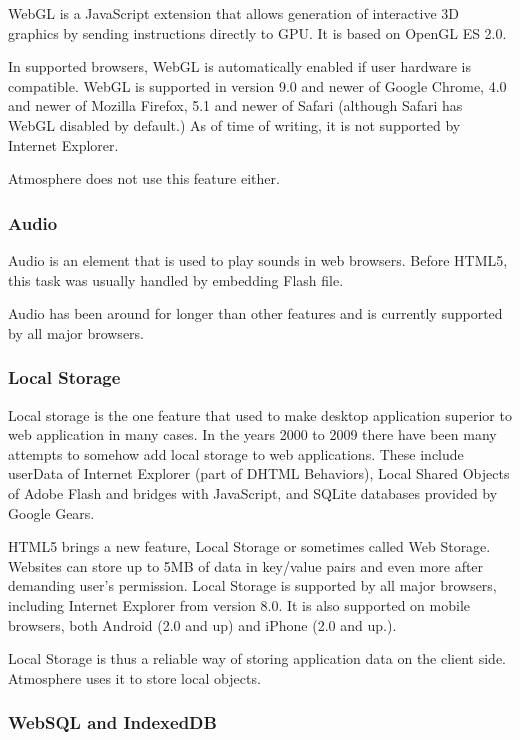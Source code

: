 WebGL is a JavaScript extension that allows generation of interactive 3D graphics by sending instructions directly to GPU. It is based on OpenGL ES 2.0. 

In supported browsers, WebGL is automatically enabled if user hardware is compatible. WebGL is  supported in version 9.0 and newer of Google Chrome, 4.0 and newer of Mozilla Firefox, 5.1 and newer of Safari (although Safari has WebGL disabled by default.) As of time of writing, it is not supported by Internet Explorer. 

Atmosphere does not use this feature either.

\subsubsection{Audio}

Audio is an element that is used to play sounds in web browsers. Before HTML5, this task was usually handled by embedding Flash file. 

Audio has been around for longer than other features and is currently supported by all major browsers.

\subsubsection{Local Storage}

Local storage is the one feature that used to make desktop application superior to web application in many cases. In the years 2000 to 2009 there have been many attempts to somehow add local storage to web applications. These include userData of Internet Explorer (part of DHTML Behaviors), Local Shared Objects of Adobe Flash and bridges with JavaScript, and SQLite databases provided by Google Gears.

HTML5 brings a new feature, Local Storage or sometimes called Web Storage. Websites can store up to 5MB of data in key/value pairs and even more after demanding user's permission. Local Storage is supported by all major browsers, including Internet Explorer from version 8.0. It is also supported on mobile browsers, both Android (2.0 and up) and iPhone (2.0 and up.). 

Local Storage is thus a reliable way of storing application data on the client side. Atmosphere uses it to store local objects. 

\subsubsection{WebSQL and IndexedDB}

